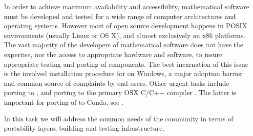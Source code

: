 \begin{workpackage}[id=component-architecture,wphases=0-48!.5,
  title=Component Architecture,lead=UV,
  PSRM=46,UVRM=8,SARM=16, USORM=6, UORM=19, LLRM=14, UJFRM=6, UGRM=14]
  \begin{tasklist}
  \begin{task}[id=portability,title=Portability,lead=UV,PM=35,partners={PS,UG,UO},wphases=0-48,issue=50]
    In order to achieve maximum availability and accessibility,
    mathematical software must be developed and tested for a wide range
    of computer architectures and operating systems.  However most of
    open source development happens in POSIX environments (usually
    Linux or OS X), and almost exclusively on x86 platforms.  The vast
    majority of the developers of mathematical software does not have
    the expertise, nor the access to appropriate hardware and software, to insure
    appropriate testing and porting of components.  The best
    incarnation of this issue is the involved installation procedure
    for \Sage on Windows, a major adoption barrier and common source of
    complaints by end-users.
    Other urgent tasks include porting \Sage to , 
    and porting \Sage to the primary OSX C/C++ compiler \clang.
    The latter is important for porting of \Sage to Conda, see
    .

    In this task we will address the common needs of the community in
    terms of portability layers, building and testing infrastructure.


\end{task}
\end{tasklist}
\end{workpackage}
